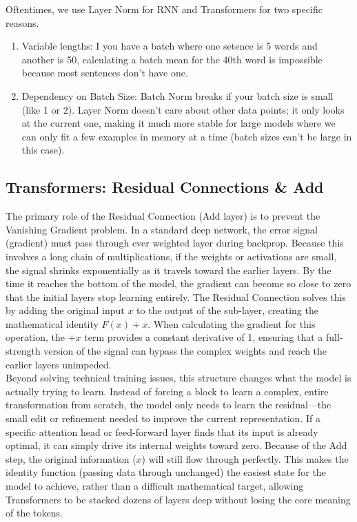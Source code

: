 \documentclass[12pt]{article}
\begin{document}
Oftentimes, we use Layer Norm for RNN and Transformers for two specific reasons. 

\begin{enumerate}
	\item Variable lengths: I you have a batch where one setence is 5 words and another is 50, calculating a batch mean for the 40th word is impossible because most sentences don't have one.
	\item Dependency on Batch Size: Batch Norm breaks if your batch size is small (like 1 or 2). Layer Norm doesn't care about other data points; it only looks at the current one, making it much more stable for large models where we can only fit a few examples in memory at a time (batch sizes can't be large in this case).
\end{enumerate}


\subsection{Transformers: Residual Connections \& Add}

The primary role of the Residual Connection (Add layer) is to prevent the Vanishing Gradient problem. In a standard deep network, the error signal (gradient) must pass through ever weighted layer during backprop. Because this involves a long chain of multiplications, if the weights or activations are small, the signal shrinks exponentially as it travels toward the earlier layers. By the time it reaches the bottom of the model, the gradient can become so close to zero that the initial layers stop learning entirely. The Residual Connection solves this by adding the original input $x$ to the output of the sub-layer, creating the mathematical identity $F(x) + x$. When calculating the gradient for this operation, the $+x$ term provides a constant derivative of 1, ensuring that a full-strength version of the signal can bypass the complex weights and reach the earlier layers unimpeded.\\

Beyond solving technical training issues, this structure changes what the model is actually trying to learn. Instead of forcing a block to learn a complex, entire transformation from scratch, the model only needs to learn the residual—the small edit or refinement needed to improve the current representation. If a specific attention head or feed-forward layer finds that its input is already optimal, it can simply drive its internal weights toward zero. Because of the Add step, the original information ($x$) will still flow through perfectly. This makes the identity function (passing data through unchanged) the easiest state for the model to achieve, rather than a difficult mathematical target, allowing Transformers to be stacked dozens of layers deep without losing the core meaning of the tokens.
\end{document}
